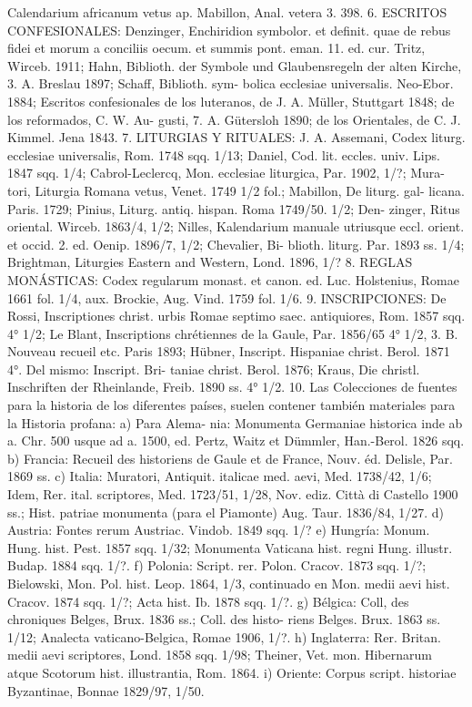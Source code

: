 \raggedbottom{} \documentclass[12pt]{book}
\begin{document}
Calendarium africanum vetus ap. Mabillon, Anal. vetera 3. 398.
6. ESCRITOS CONFESIONALES: Denzinger, Enchiridion symbolor. et
definit. quae de rebus fidei et morum a conciliis oecum. et summis pont.
eman. 11. ed. cur. Tritz, Wirceb. 1911; Hahn, Biblioth. der Symbole und
Glaubensregeln der alten Kirche, 3. A. Breslau 1897; Schaff, Biblioth. sym-
bolica ecclesiae universalis. Neo-Ebor. 1884; Escritos confesionales de los
luteranos, de J. A. Müller, Stuttgart 1848; de los reformados, C. W. Au-
gusti, 7. A. Gütersloh 1890; de los Orientales, de C. J. Kimmel. Jena 1843.
7. LITURGIAS Y RITUALES: J. A. Assemani, Codex liturg. ecclesiae
universalis, Rom. 1748 sqq. 1/13; Daniel, Cod. lit. eccles. univ. Lips. 1847
sqq. 1/4; Cabrol-Leclercq, Mon. ecclesiae liturgica, Par. 1902, 1/?; Mura-
tori, Liturgia Romana vetus, Venet. 1749 1/2 fol.; Mabillon, De liturg. gal-
licana. Paris. 1729; Pinius, Liturg. antiq. hispan. Roma 1749/50. 1/2; Den-
zinger, Ritus oriental. Wirceb. 1863/4, 1/2; Nilles, Kalendarium manuale
utriusque eccl. orient. et occid. 2. ed. Oenip. 1896/7, 1/2; Chevalier, Bi-
blioth. liturg. Par. 1893 ss. 1/4; Brightman, Liturgies Eastern and Western,
Lond. 1896, 1/?
8. REGLAS MONÁSTICAS: Codex regularum monast. et canon. ed. Luc.
Holstenius, Romae 1661 fol. 1/4, aux. Brockie, Aug. Vind. 1759 fol. 1/6.
9. INSCRIPCIONES: De Rossi, Inscriptiones christ. urbis Romae septimo
saec. antiquiores, Rom. 1857 sqq. 4° 1/2; Le Blant, Inscriptions chrétiennes
de la Gaule, Par. 1856/65 4° 1/2, 3. B. Nouveau recueil etc. Paris 1893;
Hübner, Inscript. Hispaniae christ. Berol. 1871 4°. Del mismo: Inscript. Bri-
taniae christ. Berol. 1876; Kraus, Die christl. Inschriften der Rheinlande,
Freib. 1890 ss. 4° 1/2.
10. Las Colecciones de fuentes para la historia de los diferentes países,
suelen contener también materiales para la Historia profana: a) Para Alema-
nia: Monumenta Germaniae historica inde ab a. Chr. 500 usque ad a. 1500,
ed. Pertz, Waitz et Dümmler, Han.-Berol. 1826 sqq. b) Francia: Recueil
des historiens de Gaule et de France, Nouv. éd. Delisle, Par. 1869 ss.
c) Italia: Muratori, Antiquit. italicae med. aevi, Med. 1738/42, 1/6; Idem,
Rer. ital. scriptores, Med. 1723/51, 1/28, Nov. ediz. Città di Castello
1900 ss.; Hist. patriae monumenta (para el Piamonte) Aug. Taur. 1836/84,
1/27. d) Austria: Fontes rerum Austriac. Vindob. 1849 sqq. 1/? e) Hungría:
Monum. Hung. hist. Pest. 1857 sqq. 1/32; Monumenta Vaticana hist. regni
Hung. illustr. Budap. 1884 sqq. 1/?. f) Polonia: Script. rer. Polon. Cracov.
1873 sqq. 1/?; Bielowski, Mon. Pol. hist. Leop. 1864, 1/3, continuado en
Mon. medii aevi hist. Cracov. 1874 sqq. 1/?; Acta hist. Ib. 1878 sqq. 1/?.
g) Bélgica: Coll, des chroniques Belges, Brux. 1836 ss.; Coll. des histo-
riens Belges. Brux. 1863 ss. 1/12; Analecta vaticano-Belgica, Romae 1906,
1/?. h) Inglaterra: Rer. Britan. medii aevi scriptores, Lond. 1858 sqq. 1/98;
Theiner, Vet. mon. Hibernarum atque Scotorum hist. illustrantia, Rom.
1864. i) Oriente: Corpus script. historiae Byzantinae, Bonnae 1829/97, 1/50.
\end{document}
